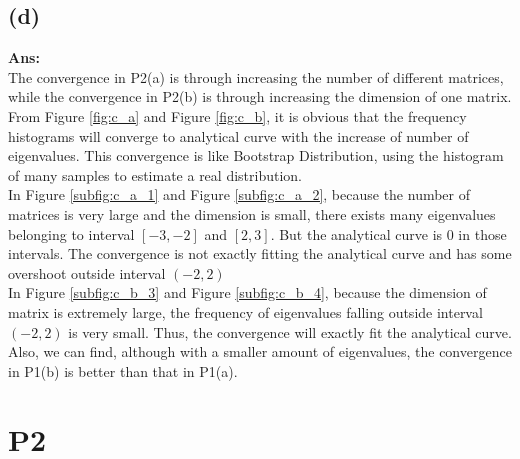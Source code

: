 \documentclass[twoside]{homework}
\begin{document}
\newpage
\subsection*{(d)}
\textbf{Ans:}\\
The convergence in P2(a) is through increasing the number of different matrices, while the convergence in P2(b) is through increasing the dimension of one matrix. \\
From Figure \ref{fig:c_a} and Figure \ref{fig:c_b}, it is obvious that the frequency histograms will converge to analytical curve with the increase of number of eigenvalues. This convergence is like Bootstrap Distribution, using the histogram of many samples to estimate a real distribution. \\
In Figure \ref{subfig:c_a_1} and Figure \ref{subfig:c_a_2}, because the number of matrices is very large and the dimension is small, there exists many eigenvalues belonging to interval $[-3,-2]$ and $[2,3]$. But the analytical curve is 0 in those intervals. The convergence is not exactly fitting the analytical curve and has some overshoot outside interval $(-2,2)$\\
In Figure \ref{subfig:c_b_3} and Figure \ref{subfig:c_b_4}, because the dimension of matrix is extremely large, the frequency of eigenvalues falling outside interval $(-2,2)$ is very small. Thus, the convergence will exactly fit the analytical curve. \\
Also, we can find, although with a smaller amount of eigenvalues, the convergence in P1(b) is better than that in P1(a). 


\section*{P2}
\end{document}
